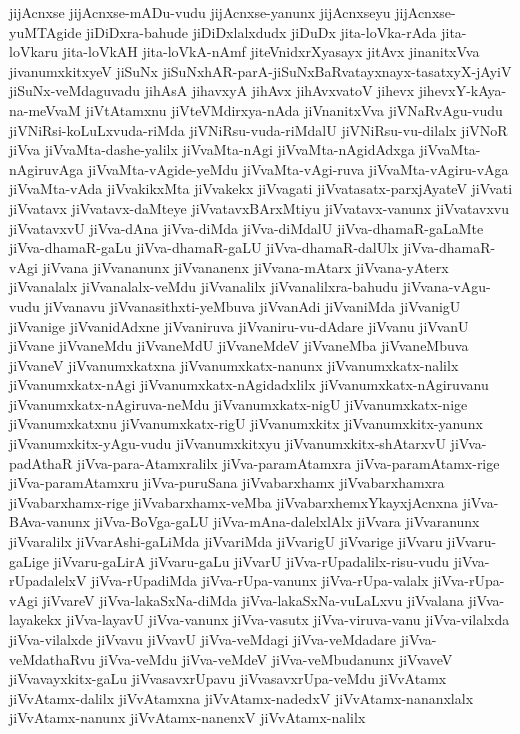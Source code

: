 {jijAcnxse
jijAcnxse-mADu-vudu
jijAcnxse-yanunx
jijAcnxseyu
jijAcnxse-yuMTAgide
jiDiDxra-bahude
jiDiDxlalxdudx
jiDuDx
jita-loVka-rAda
jita-loVkaru
jita-loVkAH
jita-loVkA-nAmf
jiteVnidxrXyasayx
jitAvx
jinanitxVva
jivanumxkitxyeV
jiSuNx
jiSuNxhAR-parA-jiSuNxBaRvatayxnayx-tasatxyX-jAyiV
jiSuNx-veMdaguvadu
jihAsA
jihavxyA
jihAvx
jihAvxvatoV
jihevx
jihevxY-kAya-na-meVvaM
jiVtAtamxnu
jiVteVMdirxya-nAda
jiVnanitxVva
jiVNaRvAgu-vudu
jiVNiRsi-koLuLxvuda-riMda
jiVNiRsu-vuda-riMdalU
jiVNiRsu-vu-dilalx
jiVNoR
jiVva
jiVvaMta-dashe-yalilx
jiVvaMta-nAgi
jiVvaMta-nAgidAdxga
jiVvaMta-nAgiruvAga
jiVvaMta-vAgide-yeMdu
jiVvaMta-vAgi-ruva
jiVvaMta-vAgiru-vAga
jiVvaMta-vAda
jiVvakikxMta
jiVvakekx
jiVvagati
jiVvatasatx-parxjAyateV
jiVvati
jiVvatavx
jiVvatavx-daMteye
jiVvatavxBArxMtiyu
jiVvatavx-vanunx
jiVvatavxvu
jiVvatavxvU
jiVva-dAna
jiVva-diMda
jiVva-diMdalU
jiVva-dhamaR-gaLaMte
jiVva-dhamaR-gaLu
jiVva-dhamaR-gaLU
jiVva-dhamaR-dalUlx
jiVva-dhamaR-vAgi
jiVvana
jiVvananunx
jiVvananenx
jiVvana-mAtarx
jiVvana-yAterx
jiVvanalalx
jiVvanalalx-veMdu
jiVvanalilx
jiVvanalilxra-bahudu
jiVvana-vAgu-vudu
jiVvanavu
jiVvanasithxti-yeMbuva
jiVvanAdi
jiVvaniMda
jiVvanigU
jiVvanige
jiVvanidAdxne
jiVvaniruva
jiVvaniru-vu-dAdare
jiVvanu
jiVvanU
jiVvane
jiVvaneMdu
jiVvaneMdU
jiVvaneMdeV
jiVvaneMba
jiVvaneMbuva
jiVvaneV
jiVvanumxkatxna
jiVvanumxkatx-nanunx
jiVvanumxkatx-nalilx
jiVvanumxkatx-nAgi
jiVvanumxkatx-nAgidadxlilx
jiVvanumxkatx-nAgiruvanu
jiVvanumxkatx-nAgiruva-neMdu
jiVvanumxkatx-nigU
jiVvanumxkatx-nige
jiVvanumxkatxnu
jiVvanumxkatx-rigU
jiVvanumxkitx
jiVvanumxkitx-yanunx
jiVvanumxkitx-yAgu-vudu
jiVvanumxkitxyu
jiVvanumxkitx-shAtarxvU
jiVva-padAthaR
jiVva-para-Atamxralilx
jiVva-paramAtamxra
jiVva-paramAtamx-rige
jiVva-paramAtamxru
jiVva-puruSana
jiVvabarxhamx
jiVvabarxhamxra
jiVvabarxhamx-rige
jiVvabarxhamx-veMba
jiVvabarxhemxYkayxjAcnxna
jiVva-BAva-vanunx
jiVva-BoVga-gaLU
jiVva-mAna-dalelxlAlx
jiVvara
jiVvaranunx
jiVvaralilx
jiVvarAshi-gaLiMda
jiVvariMda
jiVvarigU
jiVvarige
jiVvaru
jiVvaru-gaLige
jiVvaru-gaLirA
jiVvaru-gaLu
jiVvarU
jiVva-rUpadalilx-risu-vudu
jiVva-rUpadalelxV
jiVva-rUpadiMda
jiVva-rUpa-vanunx
jiVva-rUpa-valalx
jiVva-rUpa-vAgi
jiVvareV
jiVva-lakaSxNa-diMda
jiVva-lakaSxNa-vuLaLxvu
jiVvalana
jiVva-layakekx
jiVva-layavU
jiVva-vanunx
jiVva-vasutx
jiVva-viruva-vanu
jiVva-vilalxda
jiVva-vilalxde
jiVvavu
jiVvavU
jiVva-veMdagi
jiVva-veMdadare
jiVva-veMdathaRvu
jiVva-veMdu
jiVva-veMdeV
jiVva-veMbudanunx
jiVvaveV
jiVvavayxkitx-gaLu
jiVvasavxrUpavu
jiVvasavxrUpa-veMdu
jiVvAtamx
jiVvAtamx-dalilx
jiVvAtamxna
jiVvAtamx-nadedxV
jiVvAtamx-nananxlalx
jiVvAtamx-nanunx
jiVvAtamx-nanenxV
jiVvAtamx-nalilx
}
